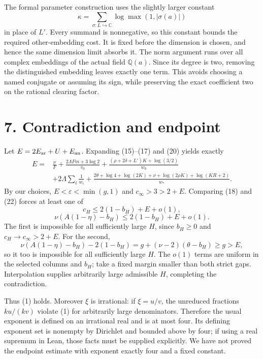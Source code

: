 \documentclass[11pt]{article}
\begin{document}
The formal parameter construction uses the slightly larger constant \[
\kappa=\sum_{\sigma:L\hookrightarrow\mathbb C}\log\max(1,|\sigma(a)|)
\] in place of \(L'\). Every summand is nonnegative, so this constant
bounds the required other-embedding cost. It is fixed before the
dimension is chosen, and hence the same dimension limit absorbs it. The
norm argument runs over all complex embeddings of the actual field
\(\mathbb Q(a)\). Since its degree is two, removing the distinguished
embedding leaves exactly one term. This avoids choosing a named
conjugate or assuming its sign, while preserving the exact coefficient
two on the rational clearing factor.

\section{7. Contradiction and
endpoint}\label{contradiction-and-endpoint}

Let \(E=2E_{\rm ar}+U+E_{\rm an}\). Expanding (15)--(17) and (20) yields
exactly \[
\begin{aligned}
E={}&\frac\nu F+
\frac{2\Lambda Fm+3\log2}{v_0}
+\frac{(\rho+2\delta+L')K+\log(3/2)}{w_0}
\\
&+2\Lambda\sum_i\frac1{w_i}
+\frac{2\theta+\log4+\log(2K)+\nu+\log(2\rho K)+\log(KR+2)}{w_*}.
\end{aligned}
\] By our choices, \(E<\varepsilon<\min(g,1)\) and \(c_\infty>3>2+E\).
Comparing (18) and (22) forces at least one of \[
c_H\le2(1-b_H)+E+o(1),                             \tag{23}
\] \[
\nu(A(1-\eta)-b_H)\le2(1-b_H)+E+o(1).              \tag{24}
\] The first is impossible for all sufficiently large \(H\), since
\(b_H\ge0\) and \(c_H\to c_\infty>2+E\). For the second, \[
\nu(A(1-\eta)-b_H)-2(1-b_H)
=g+(\nu-2)(\theta-b_H)\ge g>E,
\] so it too is impossible for all sufficiently large \(H\). The
\(o(1)\) terms are uniform in the selected columns and \(b_H\); take a
fixed margin smaller than both strict gaps. Interpolation supplies
arbitrarily large admissible \(H\), completing the contradiction.

Thus (1) holds. Moreover \(\xi\) is irrational: if \(\xi=u/v\), the
unreduced fractions \(ku/(kv)\) violate (1) for arbitrarily large
denominators. Therefore the usual exponent is defined on an irrational
real and is at most four. Its defining exponent set is nonempty by
Dirichlet and bounded above by four; if using a real supremum in Lean,
those facts must be supplied explicitly. We have not proved the endpoint
estimate with exponent exactly four and a fixed constant.
\end{document}

